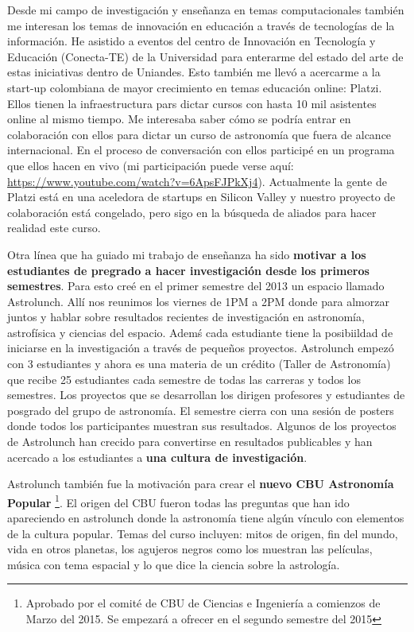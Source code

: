 \documentclass[letterpaper,12pt,onecolumn]{article}
\begin{document}
Desde mi campo de investigaci\'on y ense\~nanza en temas
computacionales tambi\'en me interesan los temas de innovaci\'on en
educaci\'on a trav\'es de tecnolog\'ias de la informaci\'on. He
asistido a eventos del centro de Innovaci\'on en Tecnolog\'ia y
Educaci\'on (Conecta-TE) de la Universidad para enterarme del estado
del arte de estas iniciativas dentro de Uniandes. Esto tambi\'en me llev\'o
a acercarme a la start-up colombiana de mayor crecimiento en temas
educaci\'on online: Platzi. Ellos tienen la infraestructura pars dictar
cursos con hasta 10 mil asistentes online al mismo tiempo. Me interesaba
saber c\'omo se podr\'ia entrar en colaboraci\'on con ellos para
dictar un curso de astronom\'ia que fuera de alcance internacional. En
el proceso de conversaci\'on con ellos particip\'e en un programa que
ellos hacen en vivo (mi participaci\'on puede verse aqu\'i:
\url{https://www.youtube.com/watch?v=6ApsFJPkXj4}). Actualmente la
gente de Platzi est\'a en una aceledora de startups en Silicon Valley
y nuestro proyecto de colaboraci\'on est\'a congelado, pero sigo en la
b\'usqueda de aliados para hacer realidad este curso.

Otra l\'inea que ha guiado mi trabajo de ense\~nanza ha sido {\bf motivar a los estudiantes de pregrado a hacer investigaci\'on desde los primeros semestres}. Para
esto cre\'e en el primer semestre del 2013 un espacio llamado Astrolunch.
All\'i nos reunimos los viernes de 1PM a 2PM donde para almorzar
juntos y hablar sobre resultados recientes de investigaci\'on en astronom\'ia,
astrof\'isica y ciencias del espacio. Adem\'s cada
estudiante tiene la posibiildad de iniciarse en la investigaci\'on a
trav\'es de peque\~nos proyectos. Astrolunch empez\'o con 3 estudiantes y
ahora es una materia de un cr\'edito (Taller de Astronom\'ia) que recibe
25 estudiantes cada semestre de todas las carreras y todos los
semestres. Los proyectos que se desarrollan los dirigen profesores y
estudiantes de posgrado del grupo de astronom\'ia. El semestre cierra
con una sesi\'on de posters donde todos los participantes muestran sus
resultados. Algunos de los proyectos de Astrolunch han crecido para
convertirse en resultados publicables y han acercado a los estudiantes
a {\bf una cultura de investigaci\'on}.


Astrolunch tambi\'en fue la motivaci\'on para crear el {\bf nuevo CBU 
  Astronom\'ia Popular} \footnote{Aprobado por el comit\'e de CBU de Ciencias e
  Ingenier\'ia a comienzos de Marzo del 2015. Se empezar\'a a ofrecer
  en el segundo semestre del 2015}. El origen del CBU fueron todas las
preguntas que han ido apareciendo en astrolunch donde la astronom\'ia
tiene alg\'un v\'inculo con elementos de la cultura popular. Temas del
curso incluyen: mitos de origen, fin del mundo, vida en otros planetas,
los agujeros negros como los muestran las pel\'iculas, m\'usica con tema
espacial y lo que dice la ciencia sobre la astrolog\'ia.
\end{document}
